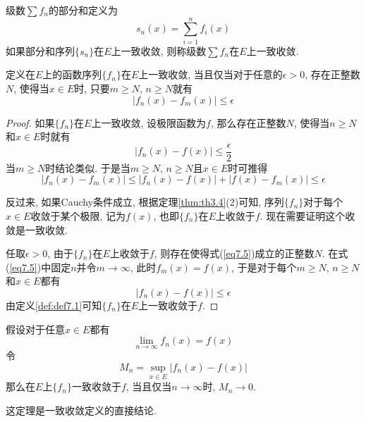 \documentclass[cn,12pt,math=mtpro2,citestyle=gb7714-2015,bibstyle=gb7714-2015,twocol]{elegantbook}
\newcommand{\limn}{\lim_{n\to\infty}}
\begin{document}
\begin{definition}
级数$\sum f_n$的部分和定义为
$$s_n(x)=\sum_{i=1}^{n}f_i(x)$$
如果部分和序列$\{s_n\}$在$E$上一致收敛, 则称级数$\sum f_n$在$E$上一致收敛.
\end{definition}
\begin{theorem}[Cauchy准则]\label{thm:th7.5}
  定义在$E$上的函数序列$\{f_n\}$在$E$上一致收敛, 当且仅当对于任意的$\epsilon>0$, 存在正整数$N$, 使得当$x\in E$时, 只要$m\geq N$, $n\geq N$就有
  \begin{equation}\label{eq7.5}
    |f_n(x)-f_m(x)|\leq\epsilon
  \end{equation}
\end{theorem}
\begin{proof}
  如果$\{f_n\}$在$E$上一致收敛, 设极限函数为$f$, 那么存在正整数$N$, 使得当$n\geq N$和$x\in E$时就有
  $$|f_n(x)-f(x)|\leq\frac{\epsilon}{2}$$
  当$m\geq N$时结论类似. 于是当$m\geq N$, $n\geq N$且$x\in E$时可推得
  $$|f_n(x)-f_m(x)|\leq |f_n(x)-f(x)|+|f(x)-f_m(x)|\leq\epsilon$$

  反过来, 如果Cauchy条件成立, 根据定理\ref{thm:th3.4}(2)可知, 序列$\{f_n\}$对于每个$x\in E$收敛于某个极限, 记为$f(x)$, 也即$\{f_n\}$在$E$上收敛于$f$. 现在需要证明这个收敛是一致收敛.

  任取$\epsilon>0$, 由于$\{f_n\}$在$E$上收敛于$f$, 则存在使得式(\ref{eq7.5})成立的正整数$N$. 在式(\ref{eq7.5})中固定$n$并令$m\to\infty$, 此时$f_m(x)=f(x)$, 于是对于每个$m\geq N$, $n\geq N$和$x\in E$都有
  $$|f_n(x)-f(x)|\leq\epsilon$$
  由定义\ref{def:def7.1}可知$\{f_n\}$在$E$上一致收敛于$f$.

\end{proof}
\begin{theorem}\label{thm:th7.1}
  假设对于任意$x\in E$都有
  $$\limn f_n(x)=f(x)$$
  令
  $$M_n=\sup_{x\in E}|f_n(x)-f(x)|$$
  那么在$E$上$\{f_n\}$一致收敛于$f$, 当且仅当$n\to\infty$时, $M_n\to0$.
\end{theorem}
这定理是一致收敛定义的直接结论.
\end{document}
